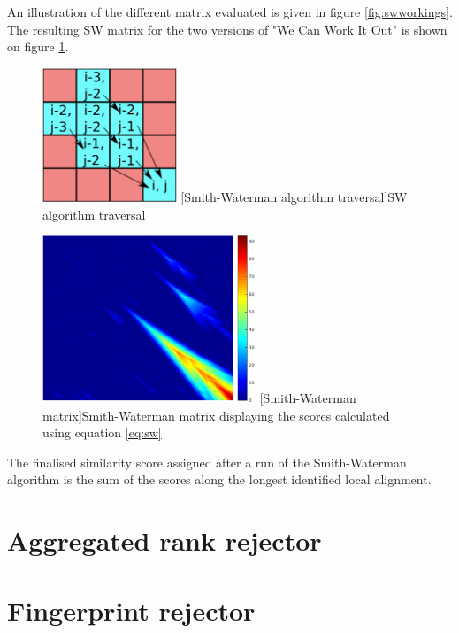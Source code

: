 An illustration of the different matrix evaluated is given in figure
\ref{fig:swworkings}. The resulting SW matrix for the two versions of "We Can
Work It Out" is shown on figure \ref{fig:swmatrix}.
\begin{figure}[H]
    \centering
    \begin{minipage}{.5\textwidth}
      \centering
      \includegraphics[height=4cm, keepaspectratio]{Algorithms/swworkings.png}
      [Smith-Waterman algorithm traversal]{SW algorithm traversal}
      \label{fig:swworkings}
    \end{minipage}%
    \begin{minipage}{.5\textwidth}
      \centering
      \includegraphics[height=5cm, keepaspectratio]{Algorithms/swmatrix.png}
      [Smith-Waterman matrix]{Smith-Waterman matrix displaying the scores calculated using equation \ref{eq:sw}}
      \label{fig:swmatrix}
    \end{minipage}
 \end{figure}

The finalised similarity score assigned after a run of the Smith-Waterman
algorithm is the sum of the scores along the longest identified local alignment.

\section{Aggregated rank rejector} 
\label{sec:rankaggregation}

\section{Fingerprint rejector} 
\label{sec:rafii}

